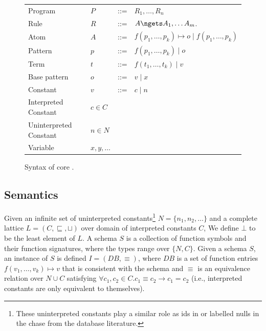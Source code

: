 \begin{figure}
  \centering
  \begin{tabular}{llcl}
     Program        & $P$ & ::= & $R_1,\ldots, R_n$                                                                 \\
     Rule           & $R$ & ::= & $A\ngets A_1,\ldots A_m$.                 \\
     Atom           & $A$ & ::= & $f(p_1,\ldots, p_k)\mapsto o\mid f(p_1,\ldots, p_k)$                 \\
     Pattern        & $p$ & ::= & $f(p_1, \ldots, p_k)\mid o$                 \\
     Term           & $t$ & ::= & $f(t_1, \ldots, t_k)\mid v$                 \\
     Base pattern          & $o$ & ::= & $v\mid x$                                               \\
     Constant       & $v$ & ::= & $c\mid n$ \\
     Interpreted Constant       & $c\in C$                                           \\
     Uninterpreted Constant       & $n\in N$                                           \\
     Variable       & $x, y, \ldots$  \\
  \end{tabular}
  \caption{
    Syntax of core \egglog. 
    }
  \label{fig:syntax}
\end{figure}

\subsection{Semantics}\label{sec:semantics}

\def\DB{\mathit{DB}}
\def\bmt{\textbf{t}}
\def\bmv{\textbf{v}}
\def\mergef{\mathit{merge}}
Given an infinite set of uninterpreted constants\footnote{
    These uninterpreted constants 
    play a similar role as \eclass ids in \eqsat
    or labelled nulls in the chase from the database literature.
}
 $N = \{n_1,n_2, \ldots\}$ 
 and a complete lattice $L = (C, \sqsubseteq, \sqcup)$ 
 over domain of interpreted constants $C$,
 We define $\bot$ to be the least element of $L$.
A schema $S$ is a collection of function symbols and their function signatures, 
 where the types range over $\{N, C\}$.
Given a schema $S$, an instance of $S$ is defined $I=(\DB, \equiv)$,
 where $\DB$ is a set of function entries $f(v_1,\ldots, v_k)\mapsto v$
 that is consistent with the schema
 and $\equiv$ is an equivalence relation over $N\cup C$ 
 satisfying $\forall c_1, c_2\in C. c_1\equiv c_2\rightarrow c_1=c_2$ 
 (i.e., interpreted constants are only equivalent to themselves).

